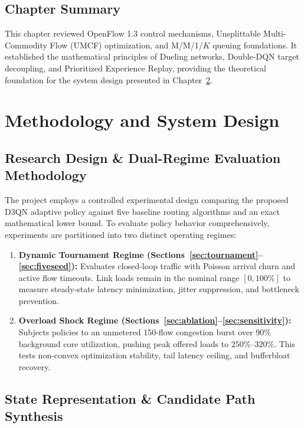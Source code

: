 \documentclass[12pt,a4paper,oneside]{report}
\begin{document}
\section{Chapter Summary}
This chapter reviewed OpenFlow 1.3 control mechanisms, Unsplittable Multi-Commodity Flow (UMCF) optimization, and M/M/1/$K$ queuing foundations. It established the mathematical principles of Dueling networks, Double-DQN target decoupling, and Prioritized Experience Replay, providing the theoretical foundation for the system design presented in Chapter~\ref{chap:design}.

\chapter{Methodology and System Design}
\label{chap:design}

\section{Research Design \& Dual-Regime Evaluation Methodology}
The project employs a controlled experimental design comparing the proposed D3QN adaptive policy against five baseline routing algorithms and an exact mathematical lower bound.
To evaluate policy behavior comprehensively, experiments are partitioned into two distinct operating regimes:
\begin{enumerate}
  \item \textbf{Dynamic Tournament Regime (Sections~\ref{sec:tournament}--\ref{sec:fiveseed}):} Evaluates closed-loop traffic with Poisson arrival churn and active flow timeouts. Link loads remain in the nominal range $[0, 100\%]$ to measure steady-state latency minimization, jitter suppression, and bottleneck prevention.
  \item \textbf{Overload Shock Regime (Sections~\ref{sec:ablation}--\ref{sec:sensitivity}):} Subjects policies to an unmetered 150-flow congestion burst over 90\% background core utilization, pushing peak offered loads to $250\%$--$320\%$. This tests non-convex optimization stability, tail latency ceiling, and bufferbloat recovery.
\end{enumerate}

\section{State Representation \& Candidate Path Synthesis}
\end{document}

